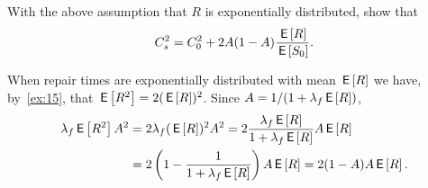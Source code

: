 \begin{exercise}\label{ex:l-161}
With the above assumption that $R$ is exponentially distributed, show that
 \begin{equation*}
 C_s^2 = C_0^2 + 2 A(1-A) \frac{\,\mathsf{E}\left[R\right]}{\,\mathsf{E}\left[S_0\right]}.
 \end{equation*}
\begin{solution}
When repair times are exponentially distributed with mean $\,\mathsf{E}\left[R\right]$ we have, by~\cref{ex:15}, that  $\,\mathsf{E}\left[R^2\right]=2(\,\mathsf{E}\left[R\right])^2$.
Since $A=1/(1+\lambda_f \,\mathsf{E}\left[R\right])$,
 \begin{equation*}
 \begin{split}
 \lambda_f \,\mathsf{E}\left[R^2\right] A^2
&= 2\lambda_f (\,\mathsf{E}\left[R\right])^2 A^2
= 2 \frac{\lambda_f \,\mathsf{E}\left[R\right] }{1+\lambda_f \,\mathsf{E}\left[R\right]} A \,\mathsf{E}\left[R\right] \\
&= 2 \left(1-\frac{1}{1+\lambda_f \,\mathsf{E}\left[R\right]}\right) A \,\mathsf{E}\left[R\right] = 2(1-A)A \,\mathsf{E}\left[R\right].
 \end{split}
 \end{equation*}
\end{solution}
\end{exercise}



